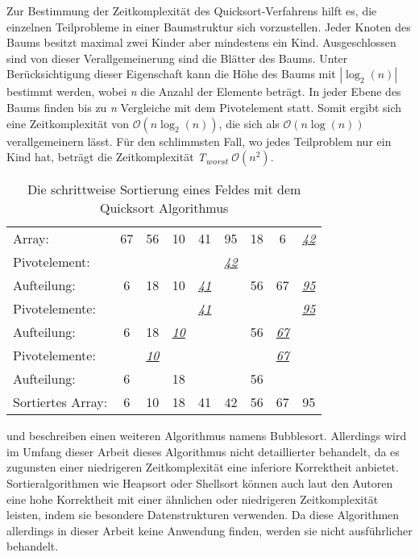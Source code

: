 Zur Bestimmung der Zeitkomplexität des Quicksort-Verfahrens hilft es, die einzelnen Teilprobleme in einer Baumstruktur sich vorzustellen. Jeder Knoten des Baums besitzt maximal zwei Kinder aber mindestens ein Kind. Ausgeschlossen sind von dieser Verallgemeinerung sind die Blätter des Baums. Unter Berücksichtigung dieser Eigenschaft kann die Höhe des Baums mit $|\log_{2}(n)|$ bestimmt werden, wobei \textit{n} die Anzahl der Elemente beträgt. In jeder Ebene des Baums finden bis zu \textit{n} Vergleiche mit dem Pivotelement statt. Somit ergibt sich eine Zeitkomplexität von $\mathcal{O}(n\log_{2}(n))$, die sich als $\mathcal{O}(n\log(n))$ verallgemeinern lässt. Für den schlimmsten Fall, wo jedes Teilproblem nur ein Kind hat, beträgt die Zeitkomplexität \textit{T\textsubscript{worst}} $\mathcal{O}(n^2)$. \autocite[216-217]{hubwieser_fundamente_2015} \autocite[79]{knebl_algorithmen_2021} \autocite[169-170]{sanders_sequential_2019}

\begin{table}[b]
	\centering
	\begin{tabular}{l *{8}{c}}
		\hline
		Array: & 67 & 56 & 10 & 41 & 95 & 18 & 6 & \textit{\underline{42}} \\
		Pivotelement: & & & & & \textit{\underline{42}} & & & \\
		Aufteilung: & 6 & 18 & 10 & \textit{\underline{41}} & & 56 & 67 & \textit{\underline{95}} \\
		Pivotelemente: & & & & \textit{\underline{41}} & & & & \textit{\underline{95}} \\
		Aufteilung:  & 6 & 18 & \textit{\underline{10}} & & & 56 & \textit{\underline{67}} & \\
		Pivotelemente: & & \textit{\underline{10}}  & & & & & \textit{\underline{67}} & \\
		Aufteilung: & 6 & & 18 & & & 56 & & \\
		Sortiertes Array: & 6 & 10 & 18 & 41 & 42 & 56 & 67 & 95 \\
		\hline
	\end{tabular}
	\caption[Beispiel eines Sortieralgorithmus]{Die schrittweise Sortierung eines Feldes mit dem Quicksort Algorithmus}
	\label{table: quick_sort}
\end{table} 

\Textcite[213-214]{hubwieser_fundamente_2015} und \textcite[582-585]{ernst_grundkurs_2020} beschreiben einen weiteren Algorithmus namens Bubblesort. Allerdings wird im Umfang dieser Arbeit dieses Algorithmus nicht detaillierter behandelt, da es zugunsten einer niedrigeren Zeitkomplexität eine inferiore Korrektheit anbietet. Sortieralgorithmen wie Heapsort oder Shellsort können auch laut den Autoren eine hohe Korrektheit mit einer ähnlichen oder niedrigeren Zeitkomplexität leisten, indem sie besondere Datenstrukturen verwenden. Da diese Algorithmen allerdings in dieser Arbeit keine Anwendung finden, werden sie nicht ausführlicher behandelt. 

